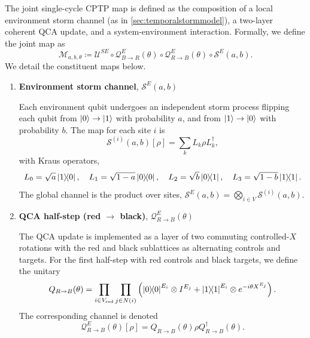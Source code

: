 The joint single-cycle CPTP map is defined as the composition of a local environment storm channel (as in \cref{sec:temporalstormmodel}), a two-layer coherent QCA update, and a system-environment interaction. Formally, we define the joint map as
\begin{equation}
    \mathcal{M}_{a, b, \theta} \coloneq \mathcal{U}^{SE} \circ \mathcal{Q}_{B\to R}^E(\theta) \circ \mathcal{Q}_{R\to B}^E(\theta) \circ \mathcal{S}^E (a, b).
\end{equation}
We detail the constituent maps below.
\begin{enumerate}
    \item \textbf{Environment storm channel}, \(\mathcal{S}^E(a, b)\)
    
    Each environment qubit undergoes an independent storm process flipping each qubit from \(\ket{0}\to\ket{1}\) with probability \(a\), and from \(\ket{1}\to\ket{0}\) with probability \(b\). The map for each site \(i\) is
    \begin{equation}
        \mathcal{S}^{(i)}(a, b)[\rho] = \sum_k L_k \rho L_k^\dagger,
    \end{equation}
    with Kraus operators,
    \begin{equation}
            L_0 = \sqrt{a}\ketbra{1}{0}, 
            \quad L_1 = \sqrt{1-a}\ketbra{0}{0}, 
            \quad L_2 = \sqrt{b}\ketbra{0}{1}, 
            \quad L_3 = \sqrt{1-b}\ketbra{1}{1}.
    \end{equation}
    The global channel is the product over sites, \(\mathcal{S}^E(a, b) = \bigotimes_{i\in V} \mathcal{S}^{(i)}(a, b)\).

    \item \textbf{QCA half-step (red \(\to\) black)}, \(\mathcal{Q}_{R\to B}^E(\theta)\)
    
    The QCA update is implemented as a layer of two commuting controlled-\(X\) rotations with the red and black sublattices as alternating controls and targets. For the first half-step with red controls and black targets, we define the unitary
    \begin{equation}
        Q_{R\to B}(\theta) = \prod_{i\in V_\mathrm{red}} \prod_{j\in N(i)}
        \left(
            \ket{0}\!\!\bra{0}^{E_i} \otimes I^{E_j} + \ket{1}\!\!\bra{1}^{E_i} \otimes e^{-i\theta X^{E_j}}
        \right).
    \end{equation}
    The corresponding channel is denoted
    \begin{equation}
        \mathcal{Q}_{R\to B}^E(\theta)[\rho] = Q_{R\to B}(\theta) \rho Q_{R\to B}^\dagger(\theta).
    \end{equation}


\end{enumerate}
